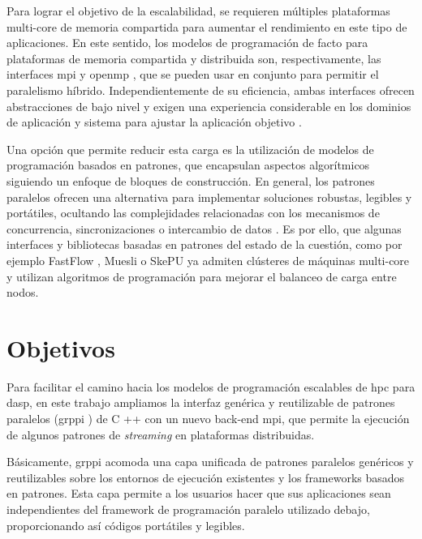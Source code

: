 \vspace{0.2cm}

Para lograr el objetivo de la escalabilidad, se requieren múltiples plataformas multi-core de memoria compartida para aumentar el rendimiento en este tipo de aplicaciones. En este sentido, los modelos de programación de facto para plataformas de memoria compartida y distribuida son, respectivamente, las interfaces \acrshort{mpi} \cite{MPI:2014} y \acrshort{openmp} \cite{OpenMP:2001}, que se pueden usar en conjunto para permitir el paralelismo híbrido. Independientemente de su eficiencia, ambas interfaces ofrecen abstracciones de bajo nivel y exigen una experiencia considerable en los dominios de aplicación y sistema para ajustar la aplicación objetivo \cite{Cappello:2000}. 

\vspace{0.2cm}

Una opción que permite reducir esta carga es la utilización de modelos de programación basados en patrones, que encapsulan aspectos algorítmicos siguiendo un enfoque de bloques de construcción. En general, los patrones paralelos ofrecen una alternativa para implementar soluciones robustas, legibles y portátiles, ocultando las complejidades relacionadas con los mecanismos de concurrencia, sincronizaciones o intercambio de datos \cite{McCool:2012}. Es por ello, que algunas interfaces y bibliotecas basadas en patrones del estado de la cuestión, como por ejemplo FastFlow \cite{Fastflow}, Muesli \cite{RePEc:zbw:ercisw:7} o SkePU \cite{Ernstsson2018} ya admiten clústeres de máquinas multi-core y utilizan algoritmos de programación para mejorar el balanceo de carga entre nodos.


\section{Objetivos}
\label{sec:objetivos}

Para facilitar el camino hacia los modelos de programación escalables de \acrshort{hpc} para \acrshort{dasp}, en este trabajo ampliamos la interfaz genérica y reutilizable de patrones paralelos (\acrshort{grppi} \cite{grppi-github}) de C ++ con un nuevo back-end \acrshort{mpi}, que permite la ejecución de algunos patrones de \emph{streaming} en plataformas distribuidas.

\vspace{0.2cm}

Básicamente, \acrshort{grppi} acomoda una capa unificada de patrones paralelos genéricos y reutilizables sobre los entornos de ejecución existentes y los frameworks basados en patrones. Esta capa permite a los usuarios hacer que sus aplicaciones sean independientes del framework de programación paralelo utilizado debajo, proporcionando así códigos portátiles y legibles. 

